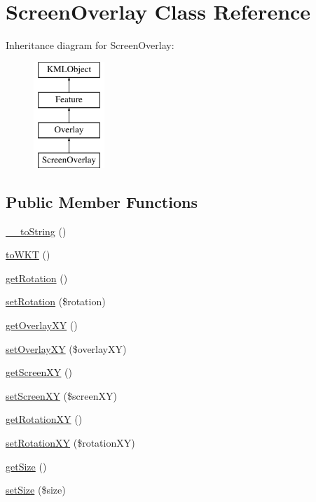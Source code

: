 \hypertarget{classScreenOverlay}{
\section{ScreenOverlay Class Reference}
\label{d8/d18/classScreenOverlay}
}
Inheritance diagram for ScreenOverlay:\begin{figure}[H]
\begin{center}
\leavevmode
\includegraphics[height=4.000000cm]{d8/d18/classScreenOverlay}
\end{center}
\end{figure}
\subsection*{Public Member Functions}
\begin{DoxyCompactItemize}
\item 
\hyperlink{classScreenOverlay_a3c23e4315345c16233d8eeec1eb4aa7d}{\_\-\_\-toString} ()
\item 
\hyperlink{classScreenOverlay_a334b2283d680453b5cb4621fb8c423bb}{toWKT} ()
\item 
\hyperlink{classScreenOverlay_a66e85d05b1ea2eda3c0f7cbf5da0380e}{getRotation} ()
\item 
\hyperlink{classScreenOverlay_ac83b3cb591e1c6d856c9f263545148b5}{setRotation} (\$rotation)
\item 
\hyperlink{classScreenOverlay_aac65ffa60a9e9eddb73c5de8e835b612}{getOverlayXY} ()
\item 
\hyperlink{classScreenOverlay_aa03c6d15dbd40e4f60f58af68ea2ab4e}{setOverlayXY} (\$overlayXY)
\item 
\hyperlink{classScreenOverlay_a21add1af174d8bb147b4d178df996f1a}{getScreenXY} ()
\item 
\hyperlink{classScreenOverlay_ae232ed55432a18f73b45ae0e0991fff2}{setScreenXY} (\$screenXY)
\item 
\hyperlink{classScreenOverlay_afb3571b1264f819edfac8f70a6744574}{getRotationXY} ()
\item 
\hyperlink{classScreenOverlay_aeb8394d90698c9bc26eae6045b539174}{setRotationXY} (\$rotationXY)
\item 
\hyperlink{classScreenOverlay_ae0231b47aa9cadd3f55a8ee278f6c81d}{getSize} ()
\item 
\hyperlink{classScreenOverlay_ad3079d20d9225afb5c7deb0bd0766938}{setSize} (\$size)
\end{DoxyCompactItemize}


